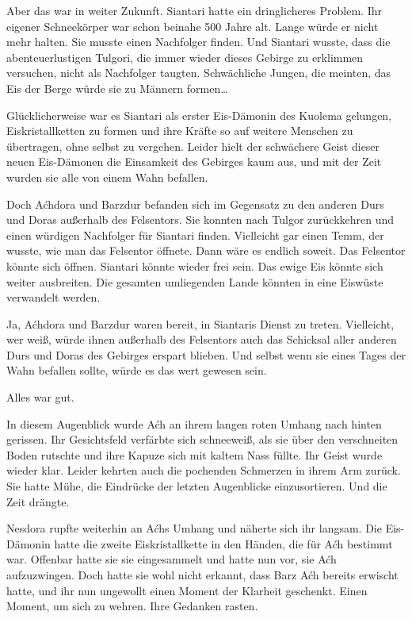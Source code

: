 Aber das war in weiter Zukunft. Siantari hatte ein dringlicheres Problem. Ihr eigener Schneekörper war schon beinahe 500 Jahre alt. Lange würde er nicht mehr halten. Sie musste einen Nachfolger finden. Und Siantari wusste, dass die abenteuerlustigen Tulgori, die immer wieder dieses Gebirge zu erklimmen versuchen, nicht als Nachfolger taugten. Schwächliche Jungen, die meinten, das Eis der Berge würde sie zu Männern formen…

Glücklicherweise war es Siantari als erster Eis-Dämonin des Kuolema gelungen, Eiskristallketten zu formen und ihre Kräfte so auf weitere Menschen zu übertragen, ohne selbst zu vergehen. Leider hielt der schwächere Geist dieser neuen Eis-Dämonen die Einsamkeit des Gebirges kaum aus, und mit der Zeit wurden sie alle von einem Wahn befallen.

Doch Aćhdora und Barzdur befanden sich im Gegensatz zu den anderen Durs und Doras außerhalb des Felsentors. Sie konnten nach Tulgor zurückkehren und einen würdigen Nachfolger für Siantari finden. Vielleicht gar einen Temm, der wusste, wie man das Felsentor öffnete. Dann wäre es endlich soweit. Das Felsentor könnte sich öffnen. Siantari könnte wieder frei sein. Das ewige Eis könnte sich weiter ausbreiten. Die gesamten umliegenden Lande könnten in eine Eiswüste verwandelt werden.

Ja, Aćhdora und Barzdur waren bereit, in Siantaris Dienst zu treten. Vielleicht, wer weiß, würde ihnen außerhalb des Felsentors auch das Schicksal aller anderen Durs und Doras des Gebirges erspart blieben. Und selbst wenn sie eines Tages der Wahn befallen sollte, würde es das wert gewesen sein.

Alles war gut.



\trennzeichen



In diesem Augenblick wurde Aćh an ihrem langen roten Umhang nach hinten gerissen. Ihr Gesichtsfeld verfärbte sich schneeweiß, als sie über den verschneiten Boden rutschte und ihre Kapuze sich mit kaltem Nass füllte. Ihr Geist wurde wieder klar. Leider kehrten auch die pochenden Schmerzen in ihrem Arm zurück. Sie hatte Mühe, die Eindrücke der letzten Augenblicke einzusortieren. Und die Zeit drängte.

Nesdora rupfte weiterhin an Aćhs Umhang und näherte sich ihr langsam. Die Eis-Dämonin hatte die zweite Eiskristallkette in den Händen, die für Aćh bestimmt war. Offenbar hatte sie sie eingesammelt und hatte nun vor, sie Aćh aufzuzwingen. Doch hatte sie wohl nicht erkannt, dass Barz Aćh bereits erwischt hatte, und ihr nun ungewollt einen Moment der Klarheit geschenkt. Einen Moment, um sich zu wehren. Ihre Gedanken rasten.

